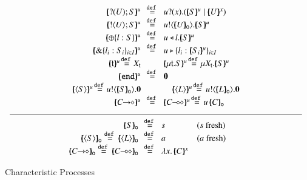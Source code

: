 \begin{figure}[t]
	\[
	\begin{array}{c}
		\begin{array}{rclcl}
			\mapchar{\btinp{U} S}{u} &\!\!\defeq\!\!
& \binp{u}{x} (\mapchar{S}{u} \Par \mapchar{U}{x})
			\\
			\mapchar{\btout{U} S}{u} &\!\!\defeq\!\!& \bout{u}{\omapchar{U}} \mapchar{S}{u} %
			\\
			\mapchar{\btsel{l : S}}{u} &\!\!\defeq\!\!& \bsel{u}{l} \mapchar{S}{u}
			\\
			\mapchar{\btbra{l_i: S_i}_{i \in I}}{u} &\!\!\defeq\!\!& \bbra{u}{l_i: \mapchar{S_i}{u}}_{i \in I}
			\\
		\mapchar{\tvar{t}}{u} \!\defeq\! \varp{X}_{\vart{t}}
& & 
			\mapchar{\trec{t}{S}}{u} \!\defeq\! \recp{X_{\vart{t}}}{\mapchar{S}{u}}
			\\
			\mapchar{\tinact}{u} &\!\!\defeq\!\!& \inact
			\\
\mapchar{\chtype{S}}{u} \!\defeq\! \bout{u}{\omapchar{S}} \inact & & 
\quad\mapchar{\chtype{L}}{u} \!\defeq\! \bout{u}{\omapchar{L}} \inact
			\\
\mapchar{\shot{C}}{u} & \!\!\defeq\!\! & \mapchar{\lhot{C}}{u} \!\defeq\! 
\appl{u}{\omapchar{C}}
\end{array}
\\
\Hline
\\
		\begin{array}{rcll}
\omapchar{S} &\!\!\defeq\!\!& s & (s \textrm{ fresh})
			\\
\omapchar{\chtype{S}} \defeq \omapchar{\chtype{L}} &\!\!\defeq\!\!& a & 
(a \textrm{ fresh})\quad\quad
			\\
			\omapchar{\shot{C}} \defeq \omapchar{\lhot{C}} &\!\!\defeq\!\!& \abs{x}{\mapchar{C}{x}}
		\end{array}
	\end{array}
	\]
\caption{Characteristic Processes\label{fig:char}}
\Hline
\end{figure}


